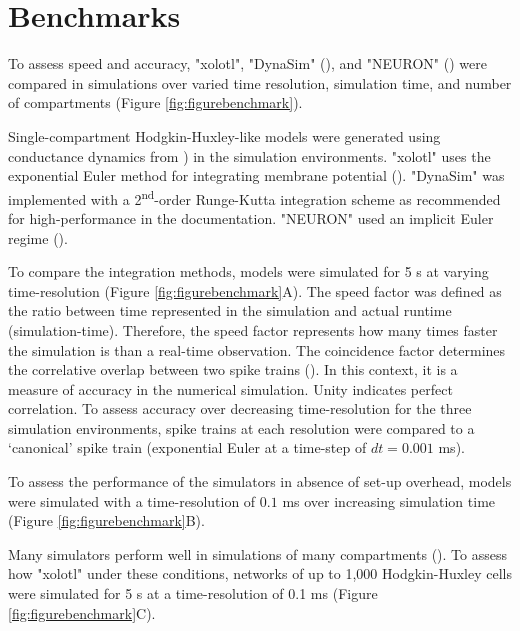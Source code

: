 \documentclass{frontiersSCNS} %
\begin{document}
%
%
%
%
%
%

\section{Benchmarks}
\label{benchmarks}

To assess speed and accuracy, "xolotl", "DynaSim" (\cite{sherfeyDynaSimMATLABToolbox2018}), and "NEURON" (\cite{hinesNEURONSimulationEnvironment1997}) were compared in simulations over varied time resolution,  simulation time, and number of compartments (Figure \ref{fig:figurebenchmark}).

Single-compartment Hodgkin-Huxley-like models were generated using conductance dynamics from \cite{liuModelNeuronActivitydependent1998}) in the simulation environments. "xolotl" uses the exponential Euler method for integrating membrane potential (\cite{dayanTheoreticalNeuroscience2001}). "DynaSim" was implemented with a 2\textsuperscript{nd}-order Runge-Kutta integration scheme as recommended for high-performance in the documentation. "NEURON" used an implicit Euler regime (\cite{hinesNEURONSimulationEnvironment1997}).

To compare the integration methods, models were simulated for 5 s at varying time-resolution (Figure \ref{fig:figurebenchmark}A). The speed factor was defined as the ratio between time represented in the simulation and actual runtime (simulation-time). Therefore, the speed factor represents how many times faster the simulation is than a real-time observation. The coincidence factor determines the correlative overlap between two spike trains (\cite{jolivetBenchmarkTestQuantitative2008}). In this context, it is a measure of accuracy in the numerical simulation. Unity indicates perfect correlation. To assess accuracy over decreasing time-resolution for the three simulation environments, spike trains at each resolution were compared to a `canonical' spike train (exponential Euler at a time-step of $dt = 0.001$ ms). 

To assess the performance of the simulators in absence of set-up overhead, models were simulated with a time-resolution of $0.1$ ms over increasing simulation time (Figure \ref{fig:figurebenchmark}B).

Many simulators perform well in simulations of many compartments (\cite{bretteSimulationNetworksSpiking2007, sherfeyDynaSimMATLABToolbox2018, vitayANNarchyCodeGeneration2015, delormeSpikeNETEventdrivenSimulation2003}). To assess how "xolotl" under these conditions, networks of up to 1,000 Hodgkin-Huxley cells were simulated for 5 s at a time-resolution of 0.1 ms (Figure \ref{fig:figurebenchmark}C).
\end{document}
